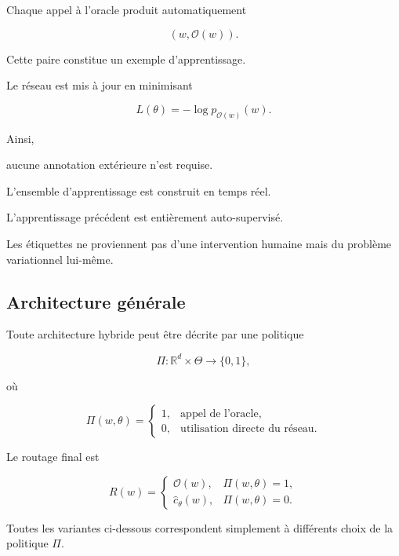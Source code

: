 Chaque appel à l'oracle produit automatiquement

\[
(w,\mathcal O(w)).
\]

Cette paire constitue un exemple d'apprentissage.

Le réseau est mis à jour en minimisant

\[
L(\theta)
=
-
\log
p_{\mathcal O(w)}(w).
\]

Ainsi,

aucune annotation extérieure n'est requise.

L'ensemble d'apprentissage est construit en temps réel.


\begin{proposition}

L'apprentissage précédent est entièrement auto-supervisé.

Les étiquettes ne proviennent pas d'une intervention humaine mais du problème
variationnel lui-même.

\end{proposition}


\subsection{Architecture générale}

Toute architecture hybride peut être décrite par une politique

\[
\Pi
:
\mathbb R^d
\times
\Theta
\longrightarrow
\{0,1\},
\]

où

\[
\Pi(w,\theta)=
\begin{cases}
1,&\text{appel de l'oracle},\\
0,&\text{utilisation directe du réseau}.
\end{cases}
\]

Le routage final est

\[
R(w)
=
\begin{cases}
\mathcal O(w),
&
\Pi(w,\theta)=1,
\\
\widehat c_\theta(w),
&
\Pi(w,\theta)=0.
\end{cases}
\]

Toutes les variantes ci-dessous correspondent simplement à différents choix
de la politique
\(
\Pi.
\)



